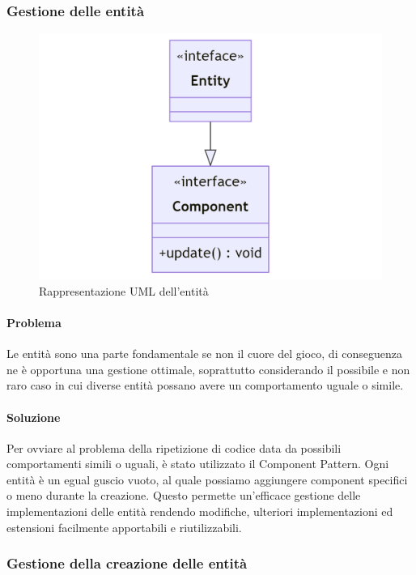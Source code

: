 \documentclass[a4paper,12pt]{report}
\begin{document}
\subsubsection{Gestione delle entità}

\begin{figure}[H]
\centering{}
\includegraphics[width=\textwidth]{img/entity.png}
\caption{Rappresentazione UML dell'entità}
\end{figure}

\paragraph{Problema} Le entità sono una parte fondamentale se non il cuore del gioco, di conseguenza ne è opportuna una gestione ottimale, soprattutto considerando il possibile e non raro caso in cui diverse entità possano avere un comportamento uguale o simile.

\paragraph{Soluzione} Per ovviare al problema della ripetizione di codice data da possibili comportamenti simili o uguali, è stato utilizzato il Component Pattern. Ogni entità è un egual guscio vuoto, al quale possiamo aggiungere component specifici o meno durante la creazione. Questo permette un’efficace gestione delle implementazioni delle entità rendendo modifiche, ulteriori implementazioni ed estensioni facilmente apportabili e riutilizzabili.

\subsubsection{Gestione della creazione delle entità}
\end{document}
